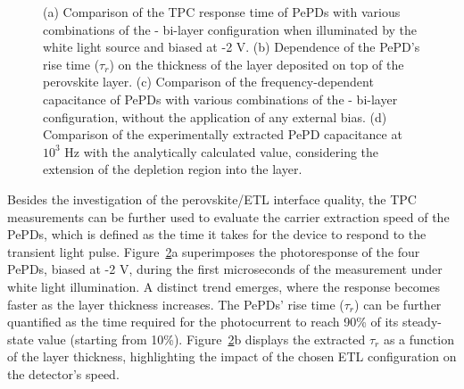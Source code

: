 \begin{figure}[ht!]
\begin{subfigure}[t]{0.4\textwidth}
        \caption{}
        \label{}
    \end{subfigure}
    \caption{(a) Comparison of the TPC response time of PePDs with various combinations of the - bi-layer configuration when illuminated by the white light source and biased at -2 V. (b) Dependence of the PePD's rise time ($\tau_r$) on the thickness of the  layer deposited on top of the perovskite layer. (c) Comparison of the frequency-dependent capacitance of PePDs with various combinations of the - bi-layer configuration, without the application of any external bias. (d) Comparison of the experimentally extracted PePD capacitance at $10^3$ Hz with the analytically calculated value, considering the extension of the depletion region into the  layer.}
    \label{fig:etl_opt:rise_time_and_capacitance}
\end{figure}

Besides the investigation of the perovskite/ETL interface quality, the TPC measurements can be further used to evaluate the carrier extraction speed of the PePDs, which is defined as the time it takes for the device to respond to the transient light pulse. Figure~\ref{fig:etl_opt:rise_time_and_capacitance}a superimposes the photoresponse of the four PePDs, biased at -2 V, during the first microseconds of the measurement under white light illumination. A distinct trend emerges, where the response becomes faster as the  layer thickness increases. The PePDs' rise time ($\tau_r$) can be further quantified as the time required for the photocurrent to reach 90\% of its steady-state value (starting from 10\%). Figure~\ref{fig:etl_opt:rise_time_and_capacitance}b displays the extracted $\tau_r$ as a function of the  layer thickness, highlighting the impact of the chosen ETL configuration on the detector's speed.  

